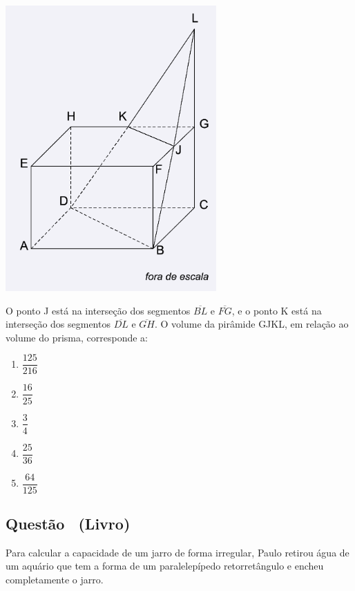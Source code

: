 \documentclass[12pt]{article}
\newcounter{questao}
\newcommand{\novaquestao}[1]{%
  \stepcounter{questao}%
  \subsection*{Questão \thequestao\ (#1)}%
}
\begin{document}
\begin{multicols}{2}
            \begin{center}
                \includegraphics[scale=0.7]{imagem/einstein_2025.png}
            \end{center} O ponto J está na interseção dos segmentos $\overline{BL}$ e $\overline{FG}$, e o ponto K está na interseção dos segmentos $\overline{DL}$ e $\overline{GH}$. O volume da pirâmide GJKL, em relação ao volume do prisma, corresponde a:

         \begin{enumerate}[label=(\alph*), noitemsep]
            \item $\dfrac{125}{216}$ \\  %
            \item $\dfrac{16}{25}$ \\
            \item $\dfrac{3}{4}$ \\
            \item $\dfrac{25}{36}$ \\
            \item $\dfrac{64}{125}$ 
        \end{enumerate}

        \novaquestao{Livro}

            Para calcular a capacidade de um jarro de forma irregular, Paulo retirou água de um aquário que tem a forma de um paralelepípedo retorretângulo e encheu completamente o jarro.


\end{multicols}
\end{document}
